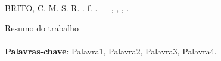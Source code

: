 	\setlength{\parindent}{0pt}
	\setlength{\absparsep}{0pt} %
	\SingleSpacing 
	BRITO, C. M. S. R. \imprimirtitulo. \pageref{LastPage} f. \imprimirdata. \imprimirtipotrabalho~-~\imprimirfaculdade, \imprimirinstituicao, \imprimirlocal, \imprimirdata. 
\vspace{ 0.5 cm} 	
\begin{resumo}
\SingleSpacing
Resumo do trabalho
\\
\\
\textbf{Palavras-chave}: Palavra1, Palavra2, Palavra3, Palavra4. %
\end{resumo}
